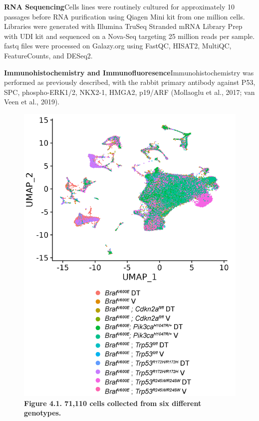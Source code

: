 \textbf{RNA Sequencing}Cells lines were routinely cultured for approximately 10 passages before RNA purification using Qiagen Mini kit from one million cells. Libraries were generated with Illumina TruSeq Stranded mRNA Library Prep with UDI kit and sequenced on a Nova-Seq targeting 25 million reads per sample. fastq files were processed on Galazy.org using FastQC, HISAT2, MultiQC, FeatureCounts, and DESeq2.

\textbf{Immunohistochemistry and Immunofluoresence}Immunohistochemistry was performed as previously described, with the rabbit primary antibody against P53, SPC, phospho-ERK1/2, NKX2-1, HMGA2, p19/ARF (Mollaoglu et al., 2017; van Veen et al., 2019).

\begin{figure}
\hypertarget{fig:04}{%
\centering
\includegraphics[width=1\textwidth,height=\textheight]{images/scrna_1.png}
\caption{\textbf{Figure 4.1. 71,110 cells collected from six different genotypes.}}\label{fig:04}
}
\end{figure}

